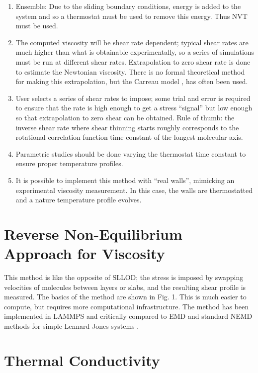 \documentclass[9pt]{livecoms}
\begin{document}
\begin{enumerate}
	\item Ensemble: Due to the sliding boundary conditions, energy is added to the system and so a thermostat must be used to remove this energy. Thus NVT must be used.
	\item The computed viscosity will be shear rate dependent; typical shear rates are much higher than what is obtainable experimentally, so a series of simulations must be run at different shear rates. Extrapolation to zero shear rate is done to estimate the Newtonian viscosity. There is no formal theoretical method for making this extrapolation, but the Carreau model \cite{Hieber1992,Kioupis2000}, has often been used.
	\item User selects a series of shear rates to impose; some trial and error is required to ensure that the rate is high enough to get a stress “signal” but low enough so that extrapolation to zero shear can be obtained. Rule of thumb: the inverse shear rate where shear thinning starts roughly corresponds to the rotational correlation function time constant of the longest molecular axis.
	\item Parametric studies should be done varying the thermostat time constant to ensure proper temperature profiles. 
	\item It is possible to implement this method with “real walls”, mimicking an experimental viscosity measurement. In this case, the walls are thermostatted and a nature temperature profile evolves.
\end{enumerate}

\section{Reverse Non-Equilibrium Approach for Viscosity}

This method is like the opposite of SLLOD; the stress is imposed by swapping velocities of molecules between layers or slabs, and the resulting shear profile is measured. The basics of the method are shown in Fig. 1. This is much easier to compute, but requires more computational infrastructure. The method \cite{Muller1999} has been implemented in LAMMPS \cite{LAMMPS} and critically compared to EMD and standard NEMD methods for simple Lennard-Jones systems \cite{Tenney2010}. 
 
\section{Thermal Conductivity}
\end{document}
